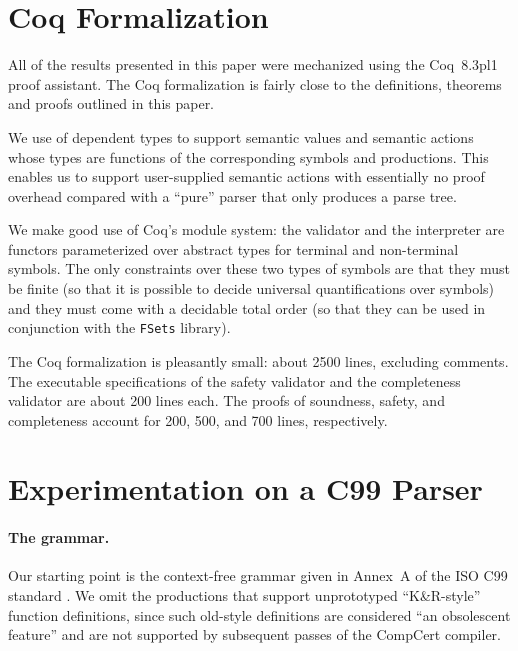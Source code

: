 \documentclass{llncs}
\begin{document}

\section{Coq Formalization}
\label{sec:coq}

All of the results presented in this paper were mechanized using the
Coq~8.3pl1 proof assistant. The Coq formalization is fairly close to the
definitions, theorems and proofs outlined in this paper.


We use of dependent types to support semantic values and semantic actions
whose types are functions of the corresponding symbols and productions.  This
enables us to support user-supplied semantic actions with essentially no proof
overhead compared with a ``pure'' parser that only produces a parse tree.

We make good use of Coq's module system: the validator and
the interpreter are functors parameterized over abstract types for terminal
and non-terminal symbols. The only constraints over these two types of symbols
are that they must be finite (so that it is possible to decide universal
quantifications over symbols) and they must come with a decidable total order
(so that they can be used in conjunction with the \verb|FSets| library).

The Coq formalization is pleasantly small: about 2500 lines, excluding
comments.  The executable specifications of the safety validator and
the completeness validator are about 200 lines each.  The proofs of
soundness, safety, and completeness account for 200, 500, and 700
lines, respectively.

\section{Experimentation on a C99 Parser}
\label{sec:C}


\paragraph{The grammar.} Our starting point is the context-free
grammar given in Annex~A of the ISO C99 standard \cite{ISO-C99}.  We
omit the productions that support unprototyped ``K\&R-style''
function definitions, since such old-style definitions are considered
``an obsolescent feature'' \cite[section 6.11.7]{ISO-C99} and are not
supported by subsequent passes of the CompCert compiler.  
\end{document}
